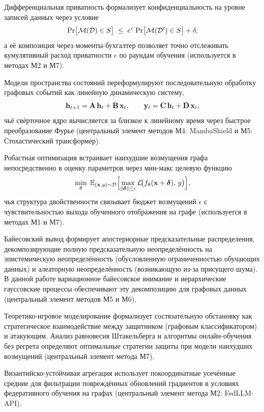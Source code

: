 Дифференциальная приватность формализует конфиденциальность на уровне записей данных через условие
\begin{equation}
\mathrm{Pr}\bigl[\mathcal{M}(\mathcal{D})\in S\bigr]
\;\le\;
e^{\epsilon}\;\mathrm{Pr}\bigl[\mathcal{M}(\mathcal{D}')\in S\bigr] + \delta,
\label{eq:dp}
\end{equation}
а её композиция через моменты-бухгалтер позволяет точно отслеживать кумулятивный расход приватности $\epsilon$ по раундам обучения (используется в методах М2 и М7).

Модели пространства состояний переформулируют последовательную обработку графовых событий как линейную динамическую систему,
\begin{equation}
\mathbf{h}_{t+1} = \mathbf{A}\,\mathbf{h}_t + \mathbf{B}\,\mathbf{x}_t, \qquad
\mathbf{y}_t = \mathbf{C}\,\mathbf{h}_t + \mathbf{D}\,\mathbf{x}_t,
\label{eq:ssm}
\end{equation}
чьё свёрточное ядро вычисляется за близкое к линейному время через быстрое преобразование Фурье (центральный элемент методов М4: MambaShield и М5: Стохастический трансформер).

Робастная оптимизация встраивает наихудшие возмущения графа непосредственно в оценку параметров через мин-макс целевую функцию
\begin{equation}
\min_\theta\;
\mathbb{E}_{(\mathbf{x},y)\sim\mathcal{D}}
\Bigl[
  \max_{\|\boldsymbol{\delta}\|\le\epsilon}
    \mathcal{L}\!\bigl(f_\theta(\mathbf{x}+\boldsymbol{\delta}),\,y\bigr)
\Bigr],
\label{eq:robust_opt}
\end{equation}
чья структура двойственности связывает бюджет возмущений $\epsilon$ с чувствительностью выхода обученного отображения на графе (используется в методах М1 и М7).

Байесовский вывод формирует апостериорные предсказательные распределения, декомпозирующие полную предсказательную неопределённость на эпистемическую неопределённость (обусловленную ограниченностью обучающих данных) и алеаторную неопределённость (возникающую из-за присущего шума). В данной работе вариационное байесовское внимание и иерархические гауссовские процессы обеспечивают эту декомпозицию для графовых данных (центральный элемент методов М5 и М6).

Теоретико-игровое моделирование формализует состязательную обстановку как стратегическое взаимодействие между защитником (графовым классификатором) и атакующим. Анализ равновесия Штакельберга и алгоритмы онлайн-обучения без регрета определяют оптимальные стратегии защиты при модели наихудших возмущений (центральный элемент метода М7).

Византийско-устойчивая агрегация использует покоординатные усечённые средние для фильтрации повреждённых обновлений градиентов в условиях федеративного обучения на графах (центральный элемент метода М2: FedLLM-API).

